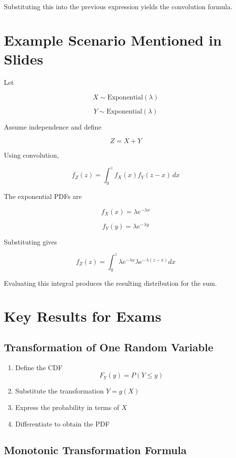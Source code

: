 \documentclass[12pt]{article}
\begin{document}
Substituting this into the previous expression yields the convolution formula.

\section{Example Scenario Mentioned in Slides}

Let

\[
X \sim \text{Exponential}(\lambda)
\]

\[
Y \sim \text{Exponential}(\lambda)
\]

Assume independence and define

\[
Z = X + Y
\]

Using convolution,

\[
f_Z(z) =
\int_0^z f_X(x)f_Y(z-x)\,dx
\]

The exponential PDFs are

\[
f_X(x) = \lambda e^{-\lambda x}
\]

\[
f_Y(y) = \lambda e^{-\lambda y}
\]

Substituting gives

\[
f_Z(z)=
\int_0^z
\lambda e^{-\lambda x}
\lambda e^{-\lambda (z-x)}
dx
\]

Evaluating this integral produces the resulting distribution for the sum.

\section{Key Results for Exams}

\subsection{Transformation of One Random Variable}

\begin{enumerate}
\item Define the CDF
\[
F_Y(y)=P(Y\le y)
\]

\item Substitute the transformation $Y=g(X)$

\item Express the probability in terms of $X$

\item Differentiate to obtain the PDF
\end{enumerate}

\subsection{Monotonic Transformation Formula}
\end{document}
